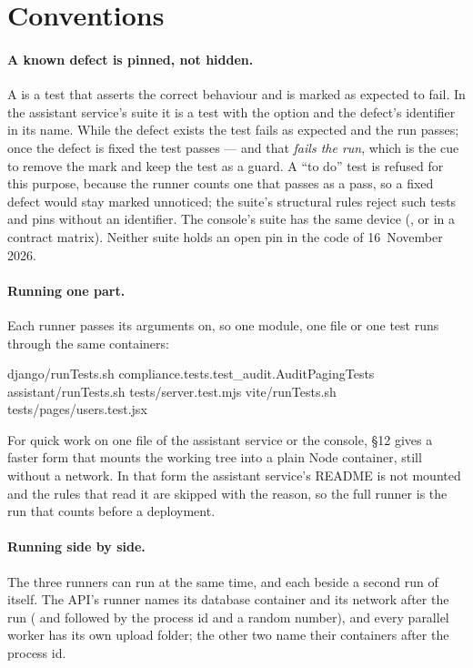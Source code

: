 \section{Conventions}\label{sec:testing:conventions}

\paragraph{A known defect is pinned, not hidden.} A  is a test that asserts the
correct behaviour and is marked as expected to fail. In the assistant service's suite it is a
test with the option  and the defect's identifier in its name. While the
defect exists the test fails as expected and the run passes; once the defect is fixed the test
passes --- and that \emph{fails the run}, which is the cue to remove the mark and keep the
test as a guard. A \enquote{to do} test is refused for this purpose, because the runner counts
one that passes as a pass, so a fixed defect would stay marked unnoticed; the suite's
structural rules reject such tests and pins without an identifier. The console's suite has the
same device (, or  in a contract matrix). Neither suite holds an
open pin in the code of 16~November 2026.

\paragraph{Running one part.} Each runner passes its arguments on, so one module, one file or
one test runs through the same containers:

\begin{codeblock}
django/runTests.sh compliance.tests.test_audit.AuditPagingTests
assistant/runTests.sh tests/server.test.mjs
vite/runTests.sh tests/pages/users.test.jsx
\end{codeblock}

For quick work on one file of the assistant service or the console,
 §12 gives a faster form that mounts the working tree into a plain
Node container, still without a network. In that form the assistant service's README is not
mounted and the rules that read it are skipped with the reason, so the full runner is the run
that counts before a deployment.

\paragraph{Running side by side.} The three runners can run at the same time, and each beside
a second run of itself. The API's runner names its database container and its network after
the run ( and  followed by the process id
and a random number), and every parallel worker has its own upload folder; the other two name
their containers after the process id.


